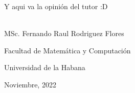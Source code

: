 \begin{opinion}
    Y aqui va la opinión del tutor :D

    \vspace{1cm}


    \begin{flushright}
        \underline{\hspace{6.5cm}}\\
        MSc. Fernando Raul Rodriguez Flores

        Facultad de Matemática y Computación

        Universidad de la Habana

        Noviembre, 2022
    \end{flushright}

\end{opinion}